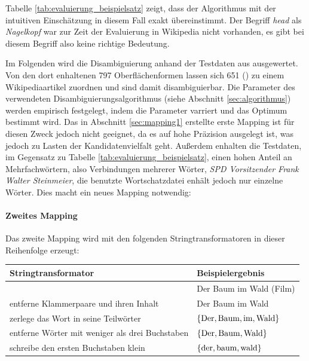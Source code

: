 \begin{bsp}
Tabelle \ref{tab:evaluierung_beispielsatz} zeigt, dass der Algorithmus mit der intuitiven Einschätzung in diesem Fall exakt übereinstimmt.
Der Begriff \emph{head} als \emph{Nagelkopf} war zur Zeit der Evaluierung in Wikipedia nicht vorhanden, es gibt bei diesem Begriff also keine richtige Bedeutung.
\end{bsp}

Im Folgenden wird die Disambiguierung anhand der Testdaten aus \cite{cucerzan2007} ausgewertet.
Von den dort enhaltenen 797 Oberflächenformen lassen sich 651 () zu einem Wikipediaartikel zuordnen und sind damit disambiguierbar.
Die Parameter des verwendeten Disambiguierungsalgorithmus (siehe Abschnitt \ref{sec:algorithmus}) werden empirisch festgelegt, indem die Parameter varriert und das Optimum bestimmt wird.
Das in Abschnitt \ref{sec:mapping1} erstellte erste Mapping ist für diesen Zweck jedoch nicht geeignet, da es auf hohe Präzision ausgelegt ist, was jedoch zu Lasten der Kandidatenvielfalt geht.
Außerdem enhalten die Testdaten, im Gegensatz zu Tabelle \ref{tab:evaluierung_beispielsatz}, einen hohen Anteil an Mehrfachwörtern, also Verbindungen mehrerer Wörter, \zb{} \emph{SPD Vorsitzender Frank Walter Steinmeier},
die benutzte Wortschatzdatei enhält jedoch nur einzelne Wörter.
Dies macht ein neues Mapping notwendig:

\paragraph{Zweites Mapping}

Das zweite Mapping wird mit den folgenden Stringtransformatoren in dieser Reihenfolge erzeugt:

\begin{center}
\begin{tabular}{ll}
\toprule
Stringtransformator				&Beispielergebnis\\
\midrule
						&Der Baum im Wald (Film)\\
entferne Klammerpaare und ihren Inhalt		&Der Baum im Wald\\
zerlege das Wort in seine Teilwörter		&$\{\textnormal{Der}, \textnormal{Baum}, \textnormal{im}, \textnormal{Wald}\}$\\
entferne Wörter mit weniger als drei Buchstaben	&$\{\textnormal{Der}, \textnormal{Baum}, \textnormal{Wald}\}$\\
schreibe den ersten Buchstaben klein		&$\{\textnormal{der}, \textnormal{baum}, \textnormal{wald}\}$\\
\bottomrule
\end{tabular}
\end{center}

